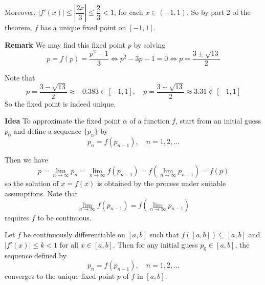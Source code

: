 \documentclass[main.tex]{subfiles}
\begin{document}
\par Moreover, $|f'(x)| \le |\dfrac{2x}{3}| \le \dfrac{2}{3} < 1$, for each $x\in (-1, 1)$. So by part 2 of the theorem, $f$ has a unique fixed point on $[-1, 1]$. 
\par \noindent \textbf{Remark} We may find this fixed point $p$ by solving 
\begin{equation}
    p = f(p) = \dfrac{p^2 - 1}{3} \Longleftrightarrow p^2 - 3p - 1 = 0 \Longleftrightarrow p = \dfrac{3 \pm \sqrt{13}}{2}
\end{equation}
\par Note that 
\begin{equation}
    p = \dfrac{3 - \sqrt{13}}{2} \approx -0.383 \in [-1, 1], \quad p = \dfrac{3 + \sqrt{13}}{2} \approx 3.31 \notin [-1, 1]
\end{equation}
So the fixed point is indeed unique. 

\par \noindent \textbf{Idea} To approximate the fixed point $\alpha$ of a function $f$, start from an initial guess $p_0$ and define a sequence $\{p_n\}$ by 
\begin{equation}
    p_n = f(p_{n-1}), \quad n = 1, 2, \ldots
\end{equation}
\par Then we have 
\begin{equation}
    p = \lim_{n \rightarrow \infty} p_n  = \lim_{n \rightarrow \infty} f(p_{n-1}) = f\left(\lim_{n \rightarrow \infty} p_{n-1}\right) = f(p)
\end{equation}
so the solution of $x = f(x)$ is obtained by the process under suitable assumptions. Note that 
\begin{equation}
    \lim_{n \rightarrow \infty} f(p_{n-1}) = f\left(\lim_{n \rightarrow \infty} p_{n-1}\right)
\end{equation}
requires $f$ to be continuous. 
\begin{theorem}
    Let $f$ be continuously differentiable on $[a, b]$ such that $f([a, b]) \subseteq [a, b]$ and $|f'(x)| \le k < 1$ for all $x\in [a, b]$. Then for any initial guess $p_0 \in [a, b]$, the sequence defined by
    \begin{equation}
        p_n = f(p_{n-1}), \quad n = 1, 2, \ldots
    \end{equation}
    converges to the unique fixed point $p$ of $f$ in $[a, b]$. 
\end{theorem}
\end{document}
